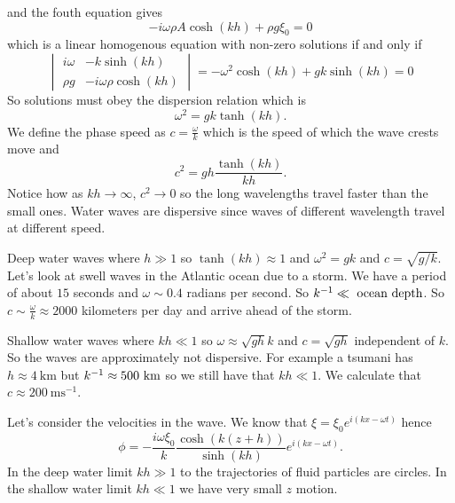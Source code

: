 \documentclass{article}
\begin{document}
and the fouth equation gives
\[
  -i\omega\rho A\cosh(kh) + \rho g \xi_0 = 0
\]
which is a linear homogenous equation with non-zero solutions if and only if
\[
  \begin{vmatrix}
	  i\omega & -k\sinh(kh) \\
	  \rho g & -i\omega \rho \cosh(kh)
  \end{vmatrix} = -\omega^2 \cosh(kh) + gk\sinh(kh) = 0
\]
So solutions must obey the dispersion relation which is
\[
  \omega^2 = gk\tanh(kh).
\]
We define the phase speed as $ c=\frac \omega k $ which is the speed of which the wave crests move and
\[
	c^2 = gh\frac{\tanh(kh)}{kh}.
\]
Notice how as $ kh\to \infty $, $ c^2 \to 0 $ so the long wavelengths travel faster than the small ones. Water waves are dispersive since waves of different wavelength travel at different speed.
\begin{example}
	Deep water waves where $ h\gg 1 $ so $ \tanh(kh) \approx 1 $ and $ \omega^2 = gk $ and $ c= \sqrt{g/k} $. Let's look at swell waves in the Atlantic ocean due to a storm. We have a period of about $ 15 $ seconds and $ \omega \sim 0.4 $ radians per second. So $ \inv k \ll \ \text{ocean depth} $. So $ c\sim \frac{\omega}k\approx 2000 $ kilometers per day and arrive ahead of the storm.
\end{example}
\begin{example}
	Shallow water waves where $ kh \ll 1 $ so $ \omega\approx \sqrt{gh}k $ and $ c=\sqrt{gh} $ independent of $ k $. So the waves are approximately not dispersive. For example a tsumani has $ h\approx 4 \ \mathrm{km}$ but $ {k}^{-1} \approx 500\ \mathrm{km} $ so we still have that $ kh\ll 1 $. We calculate that $ c\approx 200\ \mathrm{ms}^{-1} $.
\end{example}
Let's consider the velocities in the wave. We know that $ \xi = \xi_0 e^{i(kx-\omega t)} $ hence
\[
\phi =-\frac{i\omega \xi_0}{k} \frac{\cosh(k(z+h))}{\sinh(kh)}e^{i(kx-\omega t)}.
\]
In the deep water limit $ kh\gg 1 $ to the trajectories of fluid particles are circles. In the shallow water limit $ kh\ll 1 $ we have very small $ z $ motion.
\end{document}
